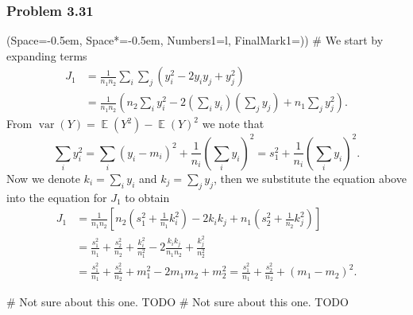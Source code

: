 \documentclass[12pt, a4paper]{article}
\newcommand{\listSpace}{-0.5em}%
\DeclareMathOperator{\E}{\mathbb{E}}
\DeclareMathOperator{\var}{\operatorname{var}}
\begin{document}
\subsubsection*{Problem 3.31}
\begin{easylist}[enumerate]
\ListProperties(Space=\listSpace, Space*=\listSpace, Numbers1=l, FinalMark1={)})
# We start by expanding terms
\begin{align*}
	J_1 &= \frac{1}{n_1 n_2} \sum_{i} \sum_{j} \left( y_i^2 - 2y_i y_j + y_j^2\right) \\ 
	&=
	\frac{1}{n_1 n_2} \left( n_2 \sum_i y_i^2 
	- 
	2\left( \sum_i y_i \right)\left( \sum_j y_j \right)
	+
	n_1 \sum_j y_j^2 
	 \right).
\end{align*}
From $\var(Y) = \E(Y^2) - \E(Y)^2$ we note that
\begin{equation*}
	\sum_i y_i^2 = \sum_i (y_i - m_i)^2 + \frac{1}{n_i} \left( \sum_i y_i \right)^2 = s_1^2 + \frac{1}{n_i} \left( \sum_i y_i \right)^2.
\end{equation*}
Now we denote $k_i = \sum_i y_i$ and $k_j = \sum_j y_j$,
then we substitute the equation above into the equation for $J_1$ to obtain
\begin{align*}
	J_1 &= \frac{1}{n_1 n_2} \left[
	n_2 \left( s_1^2 + \frac{1}{n_1} k_i^2 \right)
	- 2 k_i k_j
	+ n_1 \left( s_2^2 + \frac{1}{n_2} k_j^2 \right)
	\right] \\
	&= \frac{s_1^2}{n_1} + \frac{s_2^2}{n_2} + \frac{k_i^2}{n_1^2} - 2 \frac{k_i k_j}{n_1 n_2} + \frac{k_j^2}{n_2^2} \\
	&= \frac{s_1^2}{n_1} + \frac{s_2^2}{n_2} + 
	m_1^2 - 2 m_1 m_2 + m_2^2 = \frac{s_1^2}{n_1} + \frac{s_2^2}{n_2} + (m_1 - m_2)^2.
\end{align*}

# Not sure about this one. TODO
# Not sure about this one. TODO

\end{easylist}
\end{document}
